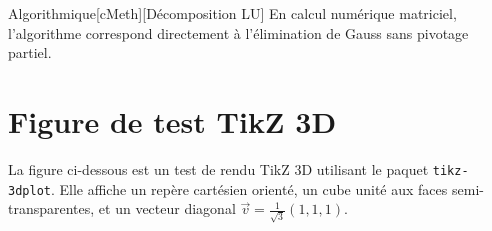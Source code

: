 \documentclass[11pt,a4paper]{report}
\begin{document}
\begin{customenv}{\faMicrochip}{Algorithmique}[cMeth][Décomposition LU]
En calcul numérique matriciel, l'algorithme correspond directement à l'élimination de Gauss sans pivotage partiel.
\end{customenv}

\section{Figure de test TikZ 3D}

\begin{example}
La figure ci-dessous est un test de rendu TikZ 3D utilisant le paquet \texttt{tikz-3dplot}.
Elle affiche un repère cartésien orienté, un cube unité aux faces semi-transparentes, et
un vecteur diagonal $\vec{v} = \frac{1}{\sqrt{3}}(1,1,1)$.
\end{example}
\end{document}

